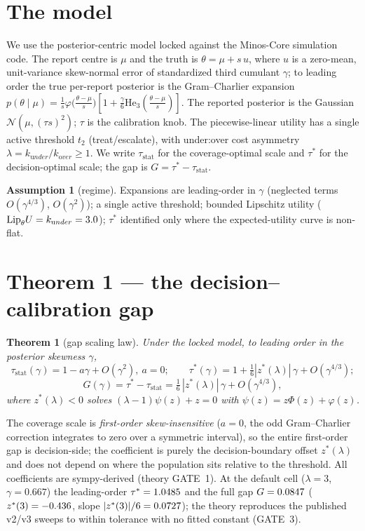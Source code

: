 \documentclass[11pt]{article}
\newtheorem{theorem}{Theorem}
\theoremstyle{definition}
\newtheorem{assumption}{Assumption}
\begin{document}
\section{The model}\label{sec:model}
We use the posterior-centric model locked against the Minos-Core simulation code. The report centre
is $\mu$ and the truth is $\theta=\mu+s\,u$, where $u$ is a zero-mean, unit-variance skew-normal
error of standardized third cumulant $\gamma$; to leading order the true per-report posterior is the
Gram--Charlier expansion $p(\theta\mid\mu)=\tfrac1s\varphi\!\big(\tfrac{\theta-\mu}{s}\big)
[1+\tfrac{\gamma}{6}\mathrm{He}_3(\tfrac{\theta-\mu}{s})]$. The reported posterior is the Gaussian
$\mathcal N(\mu,(\tau s)^2)$; $\tau$ is the calibration knob. The piecewise-linear utility has a
single active threshold $t_2$ (treat/escalate), with under:over cost asymmetry
$\lambda=k_{\mathrm under}/k_{\mathrm over}\ge1$. We write $\tau_{\mathrm{stat}}$ for the
coverage-optimal scale and $\tau^*$ for the decision-optimal scale; the gap is $G=\tau^*-\tau_{\mathrm{stat}}$.

\begin{assumption}[regime]\label{ass:regime}
Expansions are leading-order in $\gamma$ (neglected terms $O(\gamma^{4/3})$, $O(\gamma^2)$); a single
active threshold; bounded Lipschitz utility ($\mathrm{Lip}_\theta U=k_{\mathrm under}=3.0$);
$\tau^*$ identified only where the expected-utility curve is non-flat.
\end{assumption}

\section{Theorem 1 --- the decision--calibration gap}\label{sec:thy1}
\begin{theorem}[gap scaling law]\label{thm:gap}
Under the locked model, to leading order in the posterior skewness $\gamma$,
\[
\tau_{\mathrm{stat}}(\gamma)=1-a\gamma+O(\gamma^2),\ a=0;\qquad
\tau^*(\gamma)=1+\tfrac16|z^*(\lambda)|\,\gamma+O(\gamma^{4/3});
\]
\[
G(\gamma)=\tau^*-\tau_{\mathrm{stat}}=\tfrac16\,|z^*(\lambda)|\,\gamma+O(\gamma^{4/3}),
\]
where $z^*(\lambda)<0$ solves $(\lambda-1)\psi(z)+z=0$ with $\psi(z)=z\Phi(z)+\varphi(z)$.
\end{theorem}
The coverage scale is \emph{first-order skew-insensitive} ($a=0$, the odd Gram--Charlier correction
integrates to zero over a symmetric interval), so the entire first-order gap is decision-side; the
coefficient is purely the decision-boundary offset $z^*(\lambda)$ and does not depend on where the
population sits relative to the threshold. All coefficients are sympy-derived (theory GATE~1). At the
default cell ($\lambda=3$, $\gamma=0.667$) the leading-order $\tau^*=1.0485$ and the full
gap $G=0.0847$ ($z^*(3)=-0.436$, slope $|z^*(3)|/6=0.0727$); the theory reproduces
the published v2/v3 sweeps to within tolerance with no fitted constant (GATE~3).
\end{document}
